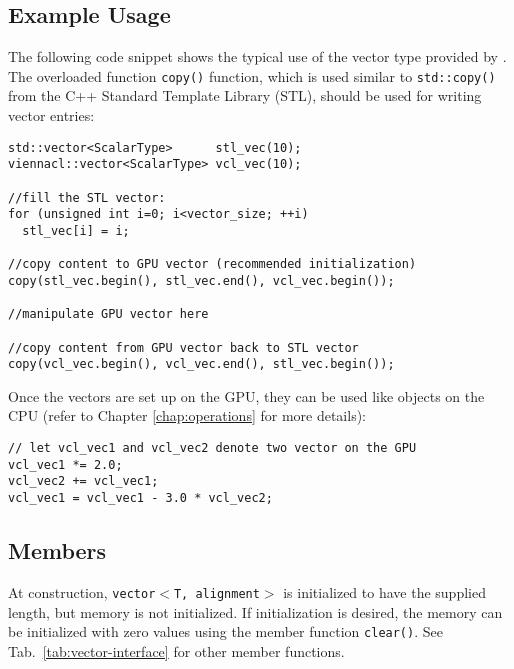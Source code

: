 \subsection{Example Usage}
The following code snippet shows the typical use of the vector type provided by
{\ViennaCL}. The overloaded function \texttt{copy()} function, which is used similar to
\lstinline|std::copy()| from the C++ Standard Template Library (STL), should be used for writing vector entries:
\begin{lstlisting}
std::vector<ScalarType>      stl_vec(10);
viennacl::vector<ScalarType> vcl_vec(10);

//fill the STL vector:
for (unsigned int i=0; i<vector_size; ++i)
  stl_vec[i] = i;

//copy content to GPU vector (recommended initialization)
copy(stl_vec.begin(), stl_vec.end(), vcl_vec.begin());

//manipulate GPU vector here

//copy content from GPU vector back to STL vector
copy(vcl_vec.begin(), vcl_vec.end(), stl_vec.begin());
\end{lstlisting}


Once the vectors are set up on the GPU, they can be used like objects on the CPU
(refer to Chapter \ref{chap:operations} for more details):
\begin{lstlisting}
// let vcl_vec1 and vcl_vec2 denote two vector on the GPU
vcl_vec1 *= 2.0;
vcl_vec2 += vcl_vec1;
vcl_vec1 = vcl_vec1 - 3.0 * vcl_vec2;
\end{lstlisting}

\subsection{Members}
At construction, \texttt{vector$<$T, alignment$>$} is initialized to have the
supplied length, but memory is not initialized. If initialization is desired,
the memory can be initialized with zero values using the member function
\lstinline|clear()|. See
Tab.~\ref{tab:vector-interface} for other member functions.


